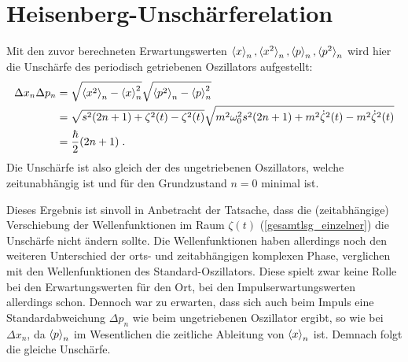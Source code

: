   \section{Heisenberg-Unschärferelation}
    Mit den zuvor berechneten Erwartungswerten $\braket{x}_n,\braket{x^2}_n,\braket{p}_n,\braket{p^2}_n$ wird hier die Unschärfe des periodisch getriebenen Oszillators aufgestellt:
    \begin{align}
      \Delta x_n\Delta p_n &= \sqrt{\braket{x^2}_n-\braket{x}^2_n}\sqrt{\braket{p^2}_n-\braket{p}^2_n} \notag\\
      &= \sqrt{s^2(2n+1)+\zeta^2(t)-\zeta^2(t)}\sqrt{m^2\omega^2_0s^2(2n+1)+m^2\dot\zeta^2(t)-m^2\dot\zeta^2(t)} \notag\\
      &= \frac{\hbar}{2}(2n+1) \; .
    \end{align}
    Die Unschärfe ist also gleich der des ungetriebenen Oszillators, welche zeitunabhängig ist und für den Grundzustand $n=0$ minimal ist.

    Dieses Ergebnis ist sinvoll in Anbetracht der Tatsache, dass die (zeitabhängige) Verschiebung der Wellenfunktionen im Raum $\zeta(t)$ (\ref{gesamtlsg_einzelner}) die Unschärfe nicht ändern sollte.
    Die Wellenfunktionen haben allerdings noch den weiteren Unterschied der orts- und zeitabhängigen komplexen Phase, verglichen mit den Wellenfunktionen des Standard-Oszillators.
    Diese spielt zwar keine  Rolle bei den Erwartungswerten für den Ort, bei den Impulserwartungswerten allerdings schon.
    Dennoch war zu erwarten, dass sich auch beim Impuls eine Standardabweichung $\Delta p_n$ wie beim ungetriebenen Oszillator ergibt, so wie bei $\Delta x_n$, da $\braket{p}_n$ im Wesentlichen die zeitliche Ableitung von $\braket{x}_n$ ist.
    Demnach folgt die gleiche Unschärfe.


\iffalse
  \subsection{Erwartungswerte der Energie}
    Hier werden wir den zeitabhängigen Erwartungswert der Energie $\braket{H(t)}_n$ aufstellen.
    Weiterhin wird der zeitlich, über eine Periode $T$, gemittelten Erwartungswert $\overline{H}_n$ mittels Formel (\ref{mittleres_H}) für eine beliebige Treibkraft bestimmt, indem wir die Quasienergien $\epsilon_n$ benutzen, welche wir in Kapitel \ref{espsilon_bel_kraft} für eine allgemeine periodische Treibkraft $S(t)$, in Abhängigkeit deren  Fourier-Koeffizienten, bestimmt haben.
\fi

